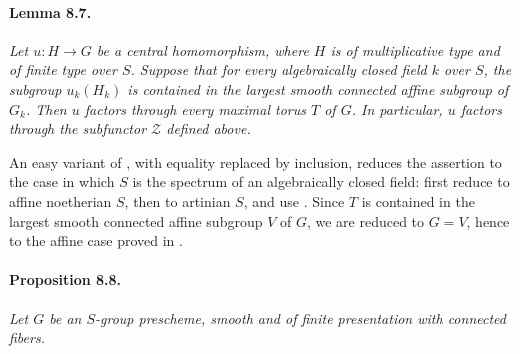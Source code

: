 \paragraph{\textbf{Lemma 8.7.}}
\emph{Let \(u:H\to G\) be a central homomorphism, where \(H\) is of
multiplicative type and of finite type over \(S\). Suppose that for
every algebraically closed field \(k\) over \(S\), the subgroup
\(u_k(H_k)\) is contained in the largest smooth connected affine
subgroup of \(G_k\). Then \(u\) factors through every maximal torus
\(T\) of \(G\). In particular, \(u\) factors through the subfunctor
\(\mathcal Z\) defined above.}

An easy variant of , with equality replaced by inclusion,
reduces the assertion to the case in which \(S\) is the spectrum of
an algebraically closed field: first reduce to affine noetherian
\(S\), then to artinian \(S\), and use . Since \(T\) is
contained in the largest smooth connected affine subgroup \(V\) of
\(G\), we are reduced to \(G=V\), hence to the affine case proved
in .

\paragraph{\textbf{Proposition 8.8.}}
\emph{Let \(G\) be an \(S\)-group prescheme, smooth and of finite
presentation with connected fibers.}

